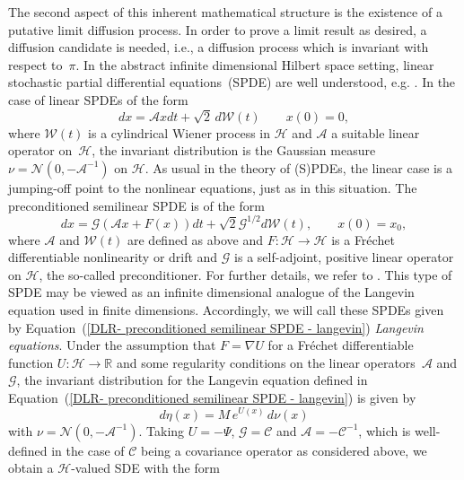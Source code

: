 The second aspect of this inherent mathematical structure is the existence of a putative limit diffusion process. In order to prove a limit result as desired, a diffusion candidate is needed, i.e., a diffusion process which is invariant with respect to~$\pi$. In the abstract infinite dimensional Hilbert space setting, linear stochastic partial differential equations~(SPDE) are well understood, e.g. \autocite{DaPrato1992, Hairer2005, Hairer2007}. In the case of linear SPDEs  of the form
\begin{equation}
 dx =  \mathcal{A} x dt + \sqrt{2} \, d \mathcal{W}(t) \qquad x(0)  =0,
\end{equation}
where $ \mathcal{W}(t) $ is a cylindrical Wiener process in $\mathcal{H}$ and $\mathcal{A}$ a suitable linear operator on~$\mathcal{H}$, the invariant distribution is the Gaussian measure~$ \nu = \mathcal{N}(0, -\mathcal{A}^{-1})$ on $\mathcal{H}$. As usual in the theory of (S)PDEs, the linear case is a jumping-off point to the nonlinear equations, just as in this situation. The preconditioned semilinear SPDE is of the form
\begin{equation}
\label{DLR- preconditioned semilinear SPDE - langevin}
 dx = \mathcal{G} (\mathcal{A}x + F(x))dt + \sqrt{2}\mathcal{G}^{1/2} d\mathcal{W}(t), \qquad x(0) = x_0,
\end{equation}
where $\mathcal{A}$ and $\mathcal{W}(t)$ are defined as above and $F: \mathcal{H} \to \mathcal{H}$ is a Fr\'{e}chet differentiable nonlinearity or drift and $\mathcal{G}$ is a self-adjoint, positive linear operator on $\mathcal{H}$, the so-called preconditioner. For further details, we refer to \autocite{Hairer2005, Hairer2007}. This type of SPDE may be viewed as an infinite dimensional analogue of the Langevin equation used in finite dimensions. Accordingly, we will call these SPDEs given by Equation~(\ref{DLR- preconditioned semilinear SPDE - langevin}) \textit{Langevin equations}. Under the assumption that $F = \nabla U$ for a  Fr\'{e}chet differentiable function $U: \mathcal{H} \to \mathbb{R}$ and some regularity conditions on the linear operators~$\mathcal{A}$ and $\mathcal{G}$, the invariant distribution for the Langevin equation defined in Equation~(\ref{DLR- preconditioned semilinear SPDE - langevin}) is given by 
\begin{equation}
 d \eta (x) = M \, e^{U(x)} \, d \nu (x)
\end{equation}
with $\nu = \mathcal{N}(0, - \mathcal{A}^{-1})$. Taking $U = - \Psi$, $\mathcal{G}= \mathcal{C}$ and $\mathcal{A}= - \mathcal{C}^{-1}$, which is well-defined in the case of $\mathcal{C}$ being a covariance operator as considered above, we obtain a $ \mathcal{H} $-valued SDE with the form
